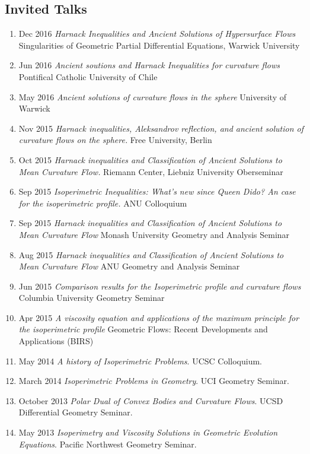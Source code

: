 \documentclass[12pt]{amsart}
\begin{document}
\subsection*{Invited Talks}
\label{sec-2-2}
\begin{enumerate}[resume]
\item Dec 2016 \emph{Harnack Inequalities and Ancient Solutions of Hypersurface Flows} Singularities of Geometric Partial Differential Equations, Warwick University
\item Jun 2016 \emph{Ancient soutions and Harnack Inequalities for curvature flows} Pontifical Catholic University of Chile
\item May 2016 \emph{Ancient solutions of curvature flows in the sphere} University of Warwick
\item Nov 2015 \emph{Harnack inequalities, Aleksandrov reflection, and ancient solution of curvature flows on the sphere.}  Free University, Berlin
\item Oct 2015 \emph{Harnack inequalities and Classification of Ancient Solutions to Mean Curvature Flow.} Riemann Center, Liebniz University Oberseminar
\item Sep 2015 \emph{Isoperimetric Inequalities: What's new since Queen Dido? An case for the isoperimetric profile.} ANU Colloquium
\item Sep 2015 \emph{Harnack inequalities and Classification of Ancient Solutions to Mean Curvature Flow} Monash University Geometry and Analysis Seminar
\item Aug 2015 \emph{Harnack inequalities and Classification of Ancient Solutions to Mean Curvature Flow} ANU Geometry and Analysis Seminar
\item Jun 2015 \emph{Comparison results for the Isoperimetric profile and curvature flows} Columbia University Geometry Seminar
\item Apr 2015 \emph{A viscosity equation and applications of the maximum principle for the isoperimetric profile} Geometric Flows: Recent Developments and Applications (BIRS)
\item May 2014 \emph{A history of Isoperimetric Problems}. UCSC Colloquium.
\item March 2014 \emph{Isoperimetric Problems in Geometry}. UCI Geometry Seminar.
\item October 2013 \emph{Polar Dual of Convex Bodies and Curvature Flows}. UCSD Differential Geometry Seminar.
\item May 2013 \emph{Isoperimetry and Viscosity Solutions in Geometric Evolution Equations}. Pacific Northwest Geometry Seminar.

\end{enumerate}
\end{document}
